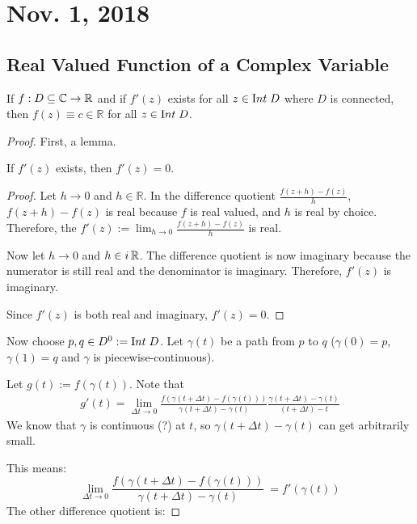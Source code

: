 \documentclass[notes]{subfile}
\begin{document}
\section{Nov. 1, 2018}
\subsection{Real Valued Function of a Complex Variable}

\begin{theorem}
    If $f:D \subseteq \operatorname{\mathbb{C}} \to \operatorname{\mathbb{R}}$ and if $f'(z)$ exists for all $z \in {\text Int}\; D$ where $D$ is connected, then $f(z) \equiv c \in \mathbb{R}$ for all $z \in {\text Int}\; D$.
\end{theorem}

\begin{proof}
First, a lemma.
    \begin{lemma}
        If $f'(z)$ exists, then $f'(z) = 0$.
    \end{lemma}

    \begin{proof}
        Let $h \to 0$ and $h \in \mathbb{R}$.
        In the difference quotient $\frac{f(z+h)-f(z)}{h}$, 
        $f(z+h) - f(z)$ is real because $f$ is real valued, 
        and $h$ is real by choice.
        Therefore, the $f'(z) := \lim_{h \to 0} \frac{f(z+h) - f(z)}{h}$ is real.

        Now let $h \to 0$ and $h \in i\operatorname{\mathbb{R}}$.  
        The difference quotient is now imaginary because the numerator is still real and the denominator is imaginary.
        Therefore, $f'(z)$ is imaginary.

        Since $f'(z)$ is both real and imaginary, $f'(z) = 0$.
    \end{proof}

    Now choose $p,q \in D^0 := {\text Int}\; D$.
    Let $\gamma(t)$ be a path from $p$ to $q$ ($\gamma(0) = p$, $\gamma(1) =q$ and $\gamma$ is piecewise-continuous).
    
    Let $g(t) := f(\gamma(t))$.
    Note that
    \begin{align*}
        g'(t) = \lim_{\Delta t \to 0} \frac{f(\gamma(t+\Delta t) - f(\gamma(t)))}{\gamma(t + \Delta t) - \gamma(t)}\frac{\gamma(t + \Delta t) - \gamma(t)}{(t + \Delta t) - t} 
    \end{align*}
    We know that $\gamma$ is continuous (?) at $t$, so $\gamma(t+\Delta t) - \gamma(t)$ can get arbitrarily small.

    This means:
    \[\lim_{\Delta t \to 0} \frac{f(\gamma(t+\Delta t) - f(\gamma(t)))}{\gamma(t + \Delta t) - \gamma(t)}\ = f'(\gamma(t)) \]
    The other difference quotient is:


\end{proof}
\end{document}
